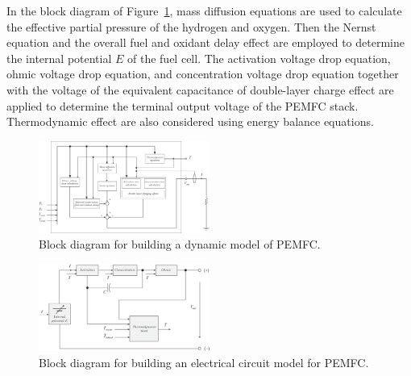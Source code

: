\documentclass[11pt,a4paper]{article}
\numberwithin{equation}{section}
\theoremstyle{it}
\theoremstyle{definition}
\begin{document}
In the block diagram of Figure~\ref{pem_fc_eq_structure_1}, mass diffusion equations are used to calculate the effective partial pressure of the hydrogen and oxygen. Then the Nernst equation and the overall fuel and oxidant delay effect are employed to determine the internal potential $E$ of the fuel cell. The activation voltage drop equation, ohmic voltage drop equation, and concentration voltage drop equation together with the voltage of the equivalent capacitance of double-layer charge effect are applied to determine the terminal output voltage of the PEMFC stack. Thermodynamic effect are also considered using energy balance equations.  
\begin{figure}[H]
	\centering
	\includegraphics[width = 0.5\textwidth, width = 400pt, angle = 0, keepaspectratio]{figures/pem_fuel_cell/pemfc_eq_structure_1.eps}
	\captionsetup{width=0.5\textwidth}		
	\caption{Block diagram for building a dynamic model of PEMFC.}
	\label{pem_fc_eq_structure_1}
\end{figure}
\begin{figure}[H]
	\centering
	\includegraphics[width = 0.5\textwidth, width = 440pt, angle = 0, keepaspectratio]{figures/pem_fuel_cell/pemfc_eq_circuit_2.eps}
	\captionsetup{width=0.5\textwidth}		
	\caption{Block diagram for building an electrical circuit model for PEMFC.}
	\label{pem_fc_eq_circuit_2}
\end{figure}
\end{document}
